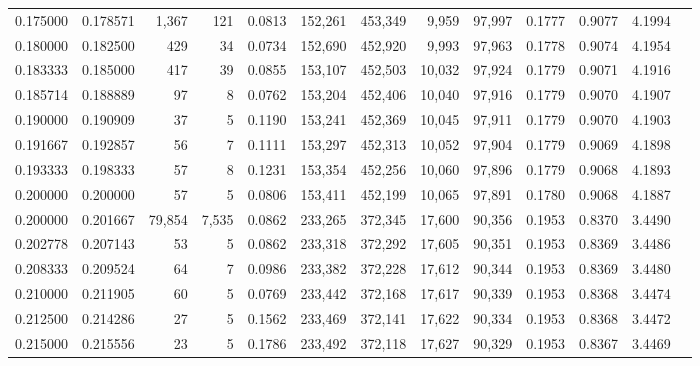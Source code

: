 \begin{tabular}{rrrrrrrrrrrrr}
0.175000 & 0.178571 &  1,367 &    121 &                                     0.0813 & 152,261 & 453,349 &   9,959 &  97,997 & 0.1777 & 0.9077 & 4.1994 \\
0.180000 & 0.182500 &    429 &     34 &                                     0.0734 & 152,690 & 452,920 &   9,993 &  97,963 & 0.1778 & 0.9074 & 4.1954 \\
0.183333 & 0.185000 &    417 &     39 &                                     0.0855 & 153,107 & 452,503 &  10,032 &  97,924 & 0.1779 & 0.9071 & 4.1916 \\
0.185714 & 0.188889 &     97 &      8 &                                     0.0762 & 153,204 & 452,406 &  10,040 &  97,916 & 0.1779 & 0.9070 & 4.1907 \\
0.190000 & 0.190909 &     37 &      5 &                                     0.1190 & 153,241 & 452,369 &  10,045 &  97,911 & 0.1779 & 0.9070 & 4.1903 \\
0.191667 & 0.192857 &     56 &      7 &                                     0.1111 & 153,297 & 452,313 &  10,052 &  97,904 & 0.1779 & 0.9069 & 4.1898 \\
0.193333 & 0.198333 &     57 &      8 &                                     0.1231 & 153,354 & 452,256 &  10,060 &  97,896 & 0.1779 & 0.9068 & 4.1893 \\
0.200000 & 0.200000 &     57 &      5 &                                     0.0806 & 153,411 & 452,199 &  10,065 &  97,891 & 0.1780 & 0.9068 & 4.1887 \\
0.200000 & 0.201667 & 79,854 &  7,535 &                                     0.0862 & 233,265 & 372,345 &  17,600 &  90,356 & 0.1953 & 0.8370 & 3.4490 \\
0.202778 & 0.207143 &     53 &      5 &                                     0.0862 & 233,318 & 372,292 &  17,605 &  90,351 & 0.1953 & 0.8369 & 3.4486 \\
0.208333 & 0.209524 &     64 &      7 &                                     0.0986 & 233,382 & 372,228 &  17,612 &  90,344 & 0.1953 & 0.8369 & 3.4480 \\
0.210000 & 0.211905 &     60 &      5 &                                     0.0769 & 233,442 & 372,168 &  17,617 &  90,339 & 0.1953 & 0.8368 & 3.4474 \\
0.212500 & 0.214286 &     27 &      5 &                                     0.1562 & 233,469 & 372,141 &  17,622 &  90,334 & 0.1953 & 0.8368 & 3.4472 \\
0.215000 & 0.215556 &     23 &      5 &                                     0.1786 & 233,492 & 372,118 &  17,627 &  90,329 & 0.1953 & 0.8367 & 3.4469 \\

\end{tabular}
